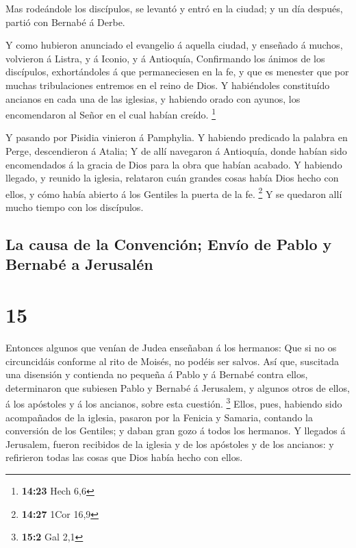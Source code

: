  Mas rodeándole los discípulos, se levantó y entró en la
ciudad; y un día después, partió con Bernabé á Derbe.

 Y como hubieron anunciado el evangelio á aquella ciudad, y
enseñado á muchos, volvieron á Listra, y á Iconio, y á Antioquía,
 Confirmando los ánimos de los discípulos, exhortándoles á
que permaneciesen en la fe, y que es menester que por muchas
tribulaciones entremos en el reino de Dios.  Y habiéndoles
constituído ancianos en cada una de las iglesias, y habiendo orado con
ayunos, los encomendaron al Señor en el cual habían creído. \footnote{\textbf{14:23}
  Hech 6,6}

 Y pasando por Pisidia vinieron á Pamphylia. 
Y habiendo predicado la palabra en Perge, descendieron á Atalia;
 Y de allí navegaron á Antioquía, donde habían sido
encomendados á la gracia de Dios para la obra que habían acabado.
 Y habiendo llegado, y reunido la iglesia, relataron cuán
grandes cosas había Dios hecho con ellos, y cómo había abierto á los
Gentiles la puerta de la fe. \footnote{\textbf{14:27} 1Cor 16,9}
 Y se quedaron allí mucho tiempo con los discípulos.

\hypertarget{la-causa-de-la-convenciuxf3n-envuxedo-de-pablo-y-bernabuxe9-a-jerusaluxe9n}{%
\subsection{La causa de la Convención; Envío de Pablo y Bernabé a
Jerusalén}\label{la-causa-de-la-convenciuxf3n-envuxedo-de-pablo-y-bernabuxe9-a-jerusaluxe9n}}

\hypertarget{section-14}{%
\section{15}\label{section-14}}

 Entonces algunos que venían de Judea enseñaban á los
hermanos: Que si no os circuncidáis conforme al rito de Moisés, no
podéis ser salvos.  Así que, suscitada una disensión y
contienda no pequeña á Pablo y á Bernabé contra ellos, determinaron que
subiesen Pablo y Bernabé á Jerusalem, y algunos otros de ellos, á los
apóstoles y á los ancianos, sobre esta cuestión. \footnote{\textbf{15:2}
  Gal 2,1}  Ellos, pues, habiendo sido acompañados de la
iglesia, pasaron por la Fenicia y Samaria, contando la conversión de los
Gentiles; y daban gran gozo á todos los hermanos.  Y
llegados á Jerusalem, fueron recibidos de la iglesia y de los apóstoles
y de los ancianos: y refirieron todas las cosas que Dios había hecho con
ellos.

